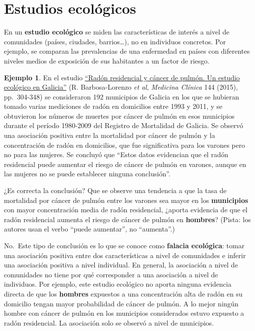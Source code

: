 \documentclass[
]{book}
\theoremstyle{definition}
\theoremstyle{definition}
\newtheorem{example}{Ejemplo}[chapter]
\theoremstyle{definition}
\theoremstyle{definition}
\theoremstyle{remark}
\begin{document}
\hypertarget{sec:ecol}{%
\section{Estudios ecológicos}\label{sec:ecol}}

En un \textbf{estudio ecológico} se miden las características de interés a nivel de comunidades (países, ciudades, barrios\ldots), no en individuos concretos. Por ejemplo, se comparan las prevalencias de una enfermedad en países con diferentes niveles medios de exposición de sus habitantes a un factor de riesgo.

\begin{example}
\protect\hypertarget{exm:radon}{}\label{exm:radon}En el estudio \href{https://www.sciencedirect.com/science/article/pii/S0025775313009202}{``Radón residencial y cáncer de pulmón. Un estudio ecológico en Galicia''} (R. Barbosa-Lorenzo \emph{et al}, \emph{Medicina Clínica} 144 (2015), pp.~304-348) se consideraron 192 municipios de Galicia en los que se hubieran tomado varias mediciones de radón en domicilios entre 1993 y 2011, y se obtuvieron los números de muertes por cáncer de pulmón en esos municipios durante el período 1980-2009 del Registro de Mortalidad de Galicia. Se observó una asociación positiva entre la mortalidad por cáncer de pulmón y la concentración de radón en domicilios, que fue significativa para los varones pero no para las mujeres. Se concluyó que ``Estos datos evidencian que el radón residencial puede aumentar el riesgo de cáncer de pulmón en varones, aunque en las mujeres no se puede establecer ninguna conclusión''.
\end{example}

¿Es correcta la conclusión? Que se observe una tendencia a que la tasa de mortalidad por cáncer de pulmón entre los varones sea mayor en los \textbf{municipios} con mayor concentración media de radón residencial, ¿aporta evidencia de que el radón residencial aumenta el riesgo de cáncer de pulmón en \textbf{hombres}? (Pista: los autores usan el verbo ``puede aumentar'', no ``aumenta''.)

No.~Este tipo de conclusión es lo que se conoce como \textbf{falacia ecológica}: tomar una asociación positiva entre dos características a nivel de comunidades e inferir una asociación positiva a nivel individual. En general, la asociación a nivel de comunidades no tiene por qué corresponder a una asociación a nivel de individuos. Por ejemplo, este estudio ecológico no aporta ninguna evidencia directa de que los \textbf{hombres} expuestos a una concentración alta de radón en su domicilio tengan mayor probabilidad de cáncer de pulmón. A lo mejor ningún hombre con cáncer de pulmón en los municipios considerados estuvo expuesto a radón residencial. La asociación solo se observó a nivel de municipios.
\end{document}
